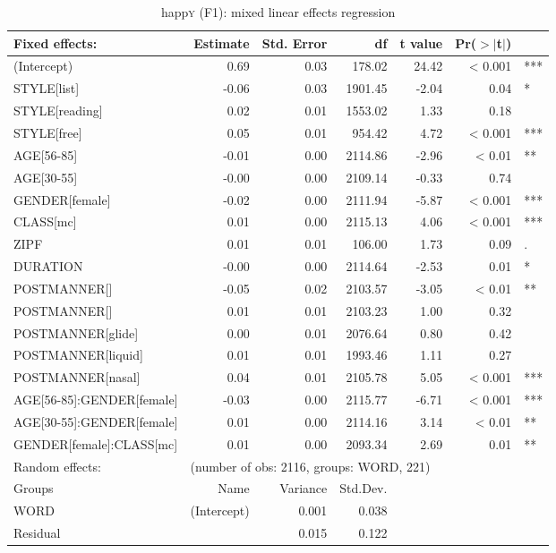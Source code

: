 	\begin{table}[h]
		\centering
		\caption{happ\textsc{y} (F1): mixed linear effects regression}
		\label{tab.regression.happy.f1}
		\footnotesize
		\begin{tabular}{p{}rrrrrl}
			\hline
			Fixed effects: & Estimate & Std. Error & df & t value & Pr($>$$|$t$|$) & \\ 
			\hline
			(Intercept) & 0.69 & 0.03 & 178.02 & 24.42 & < 0.001 & *** \\ 
			STYLE[list] & -0.06 & 0.03 & 1901.45 & -2.04 & 0.04 & * \\ 
			STYLE[reading] & 0.02 & 0.01 & 1553.02 & 1.33 & 0.18 & \\ 
			STYLE[free] & 0.05 & 0.01 & 954.42 & 4.72 & < 0.001 & *** \\ 
			AGE[56-85] & -0.01 & 0.00 & 2114.86 & -2.96 & < 0.01 & **\\ 
			AGE[30-55] & -0.00 & 0.00 & 2109.14 & -0.33 & 0.74 & \\ 
			GENDER[female] & -0.02 & 0.00 & 2111.94 & -5.87 & < 0.001 & *** \\ 
			CLASS[mc] & 0.01 & 0.00 & 2115.13 & 4.06 & < 0.001 & *** \\ 
			ZIPF & 0.01 & 0.01 & 106.00 & 1.73 & 0.09 & .\\ 
			DURATION & -0.00 & 0.00 & 2114.64 & -2.53 & 0.01 & *\\ 
			POSTMANNER[\isi{affricate}] & -0.05 & 0.02 & 2103.57 & -3.05 & < 0.01 & ** \\ 
			POSTMANNER[\isi{fricative}] & 0.01 & 0.01 & 2103.23 & 1.00 & 0.32 & \\ 
			POSTMANNER[glide] & 0.00 & 0.01 & 2076.64 & 0.80 & 0.42 & \\ 
			POSTMANNER[liquid] & 0.01 & 0.01 & 1993.46 & 1.11 & 0.27 & \\ 
			POSTMANNER[nasal] & 0.04 & 0.01 & 2105.78 & 5.05 & < 0.001 & *** \\ 
			AGE[56-85]:GENDER[female] & -0.03 & 0.00 & 2115.77 & -6.71 & < 0.001 & *** \\ 
			AGE[30-55]:GENDER[female] & 0.01 & 0.00 & 2114.16 & 3.14 & < 0.01 & ** \\ 
			GENDER[female]:CLASS[mc] & 0.01 & 0.00 & 2093.34 & 2.69 & 0.01 & **\\ 
			\hline
			Random effects: & \multicolumn{6}{l}{(number of obs: 2116, groups: WORD, 221)} \\
			Groups &         Name & Variance &      Std.Dev. & & & \\
			WORD &  (Intercept) & 0.001 & 0.038 & & & \\
			Residual  &         & 0.015 & 0.122 & & & \\
			\hline
		\end{tabular}
	\end{table}

